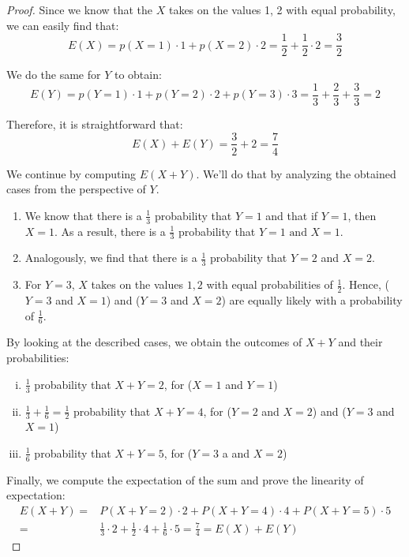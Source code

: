 \begin{proof}
    Since we know that the $X$ takes on the values 1, 2 with equal probability, we can easily find that:
     \[
         E(X) = p(X = 1) \cdot 1 + p(X = 2) \cdot 2 = \frac{1}{2} + \frac{1}{2} \cdot 2 =\frac{3}{2}
    \] 

    We do the same for $Y$ to obtain:
    \[
        E(Y) = p(Y = 1) \cdot 1 + p(Y = 2) \cdot 2 + p(Y = 3) \cdot 3 
        = \frac{1}{3} + \frac{2}{3} + \frac{3}{3} = 2
    \] 

    Therefore, it is straightforward that:
    \[
        E(X) + E(Y) = \frac{3}{2} + 2 = \frac{7}{4}
    \] 

    We continue by computing $E(X + Y)$. We'll do that by analyzing the obtained cases from the perspective
    of  $Y$. 
    \begin{enumerate}[(1)]
        \item We know that there is a  $\frac{1}{3}$ probability that $Y = 1$ and that if $Y = 1$, then $X = 1$.
            As a result, there is a $\frac{1}{3}$ probability that $Y = 1 \text{ and } X = 1$.

        \item Analogously, we find that there is a $\frac{1}{3}$ probability that $Y = 2$ and $X = 2$.

        \item For $Y = 3$, $X$ takes on the values $1, 2$ with equal probabilities of $\frac{1}{2}$. Hence,
            ($Y = 3$ and $X = 1$) and ($Y = 3$ and $X = 2$) are equally likely with a probability 
            of $\frac{1}{6}$.  
    \end{enumerate}

    By looking at the described cases, we obtain the outcomes of $X + Y$ and their probabilities:
    \begin{enumerate}[(i)]
        \item $\frac{1}{3}$ probability that $X + Y = 2$, for ($X = 1$ and $Y = 1$)

        \item $\frac{1}{3} + \frac{1}{6} = \frac{1}{2}$ probability that $X + Y = 4$, for ($Y = 2$ and $X = 2$)
    and ($Y = 3$ and  $X = 1$)

    \item $\frac{1}{6}$ probability that $X + Y = 5$, for ($Y = 3$ a and $X = 2$)
    \end{enumerate}

    Finally, we compute the expectation of the sum and prove the linearity of expectation:
    \begin{align*}
        E(X + Y) =& P(X + Y = 2) \cdot 2 + P(X + Y = 4) \cdot 4 + P(X + Y = 5) \cdot 5 \\
        =& \frac{1}{3} \cdot 2 + \frac{1}{2} \cdot 4 + \frac{1}{6} \cdot 5 = \frac{7}{4} = E(X) + E(Y) 
    \end{align*}
\end{proof}

